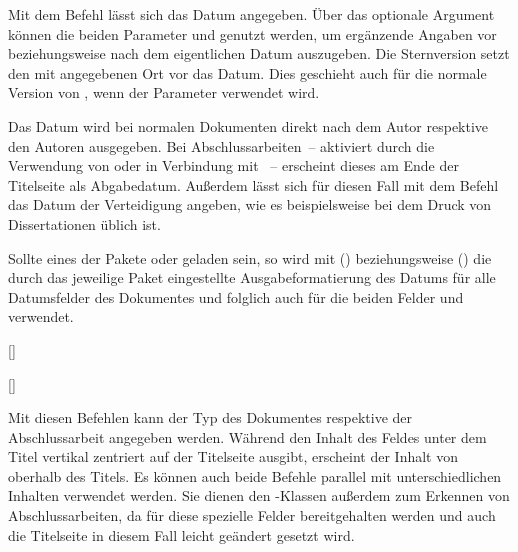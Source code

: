 \begin{DeclareEntity*}{}
\begin{DeclareEntity*}{}
\begin{DeclareEntity*}{}
\begin{Declaration}
\begin{Declaration}
\begin{Declaration}
\begin{Declaration}
\begin{Declaration}
\begin{Declaration}
Mit dem Befehl  lässt sich das Datum angegeben. 
%
Über das optionale Argument können die beiden Parameter 
 und  genutzt werden, um 
ergänzende Angaben vor beziehungsweise nach dem eigentlichen Datum auszugeben. 
Die Sternversion  setzt den mit  angegebenen Ort vor 
das Datum. Dies geschieht auch für die normale Version von , wenn 
der Parameter  verwendet wird.

Das Datum wird bei normalen Dokumenten direkt nach dem Autor respektive den 
Autoren ausgegeben. Bei Abschlussarbeiten~-- aktiviert durch die Verwendung von 
 oder  in Verbindung mit ~-- 
erscheint dieses am Ende der Titelseite als Abgabedatum. Außerdem lässt sich 
für diesen Fall mit dem Befehl  das Datum der Verteidigung 
angeben, wie es beispielsweise bei dem Druck von Dissertationen üblich ist.

Sollte eines der Pakete  oder  geladen 
sein, so wird mit () beziehungsweise 
() die durch das jeweilige Paket eingestellte 
Ausgabeformatierung des Datums für alle Datumsfelder des Dokumentes und 
folglich auch für die beiden Felder  und  
verwendet.
\end{Declaration}
\end{Declaration}
\end{Declaration}
\end{Declaration}
\end{Declaration}
\end{Declaration}

\begin{Declaration}
  {[]}
\begin{Declaration}
  {[]}

Mit diesen Befehlen kann der Typ des Dokumentes respektive der Abschlussarbeit 
angegeben werden. Während  den Inhalt des Feldes unter dem Titel 
vertikal zentriert auf der Titelseite ausgibt, erscheint der Inhalt von 
 oberhalb des Titels. Es können auch beide Befehle parallel mit 
unterschiedlichen Inhalten verwendet werden. Sie dienen den \TUDScript-Klassen 
außerdem zum Erkennen von Abschlussarbeiten, da für diese spezielle Felder 
bereitgehalten werden und auch die Titelseite in diesem Fall leicht geändert 
gesetzt wird.


\end{Declaration}
\end{Declaration}
\end{DeclareEntity*}
\end{DeclareEntity*}
\end{DeclareEntity*}
